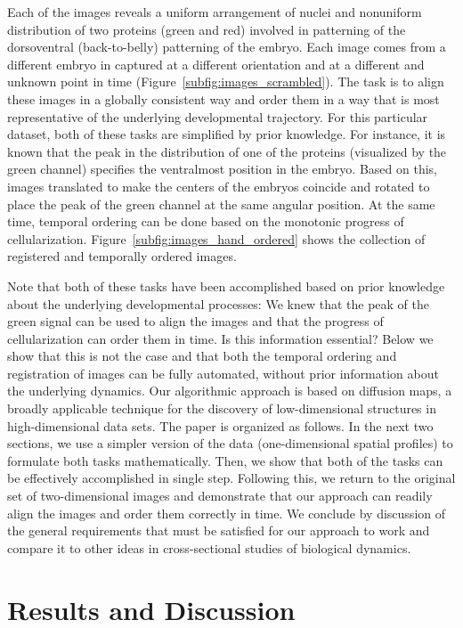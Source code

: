 \documentclass{pnastwo}
\begin{document}
\begin{article}
Each of the images reveals a uniform arrangement of nuclei and nonuniform distribution of two proteins (green and red) involved in patterning of the dorsoventral (back-to-belly) patterning of the embryo. 
%
Each image comes from a different embryo in captured at a different orientation and at a different and unknown point in time (Figure~\ref{subfig:images_scrambled}). 
%
The task is to align these images in a globally consistent way and order them in a way that is most representative of the underlying developmental trajectory. 
%
For this particular dataset, both of these tasks are simplified by prior knowledge. 
%
For instance, it is known that the peak in the distribution of one of the proteins (visualized by the green channel) specifies the ventralmost position in the embryo. 
%
Based on this, images translated to make the centers of the embryos coincide and rotated to place the peak of the green channel at the same angular position. 
%
At the same time, temporal ordering can be done based on the monotonic progress of cellularization. 
%
Figure~\ref{subfig:images_hand_ordered} shows the collection of registered and temporally ordered images. 

Note that both of these tasks have been accomplished based on prior knowledge about the underlying developmental processes: We knew that the peak of the green signal can be used to align the images and that the progress of cellularization can order them in time. 
%
Is this information essential? 
%
Below we show that this is not the case and that both the temporal ordering and registration of images can be fully automated, without prior information about the underlying dynamics. 
%
Our algorithmic approach is based on diffusion maps, a broadly applicable technique for the discovery of low-dimensional structures in high-dimensional data sets. 
%
The paper is organized as follows. 
%
In the next two sections, we use a simpler version of the data (one-dimensional spatial profiles) to formulate both tasks mathematically.  
%
Then, we show that both of the tasks can be effectively accomplished in single step. 
%
Following this, we return to the original set of two-dimensional images and demonstrate that our approach can readily align the images and order them correctly in time. 
%
We conclude by discussion of the general requirements that must be satisfied for our approach to work and compare it to other ideas in cross-sectional studies of biological dynamics. 


\section{Results and Discussion}



\end{article}
\end{document}
